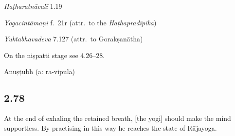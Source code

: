 \begin{ekdosis}
\begin{testimonia}[hp02_077]
\emph{Haṭharatnāvalī} 1.19

\begin{versinnote}
\end{versinnote}

\emph{Yogacintāmaṇi} f.~21r (attr.~to the \emph{Haṭhapradīpika})

\begin{versinnote}
\end{versinnote}

\emph{Yuktabhavadeva} 7.127 (attr.~to Gorakṣanātha)

\begin{versinnote}
\end{versinnote}

\end{testimonia}

\begin{philcomm}[hp02_077]
On the niṣpatti stage see 4.26–28.
\end{philcomm}

\begin{metre}[hp02_077]
Anuṣṭubh (a: ra-vipulā)
\end{metre}

\subsection*{2.78}
\begin{translation}[hp02_078]
At the end of exhaling the retained breath, [the yogi] should make the mind supportless. By practising in this way he reaches the state of Rājayoga.
\end{translation}


\end{ekdosis}
